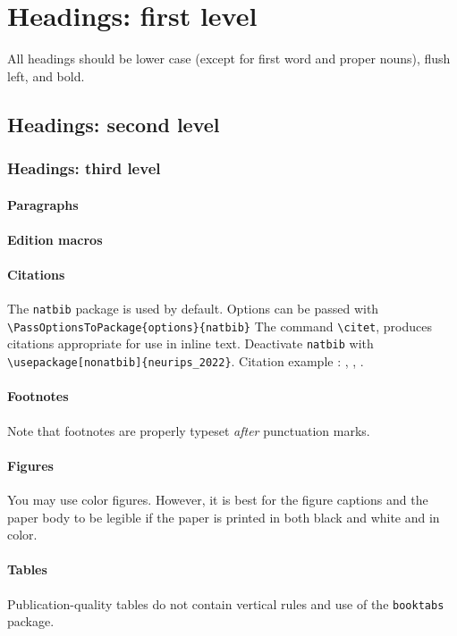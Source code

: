 \section{Headings: first level}
\label{sec:headings}

All headings should be lower case (except for first word and proper nouns),
flush left, and bold.

\subsection{Headings: second level}

\subsubsection{Headings: third level}

\paragraph{Paragraphs}

\paragraph{Edition macros}

\paragraph{Citations}
The \verb+natbib+ package is used by default. 
Options can be passed with \verb+\PassOptionsToPackage{options}{natbib}+
The command \verb+\citet+, produces citations appropriate for
use in inline text.
Deactivate \verb+natbib+ with \verb+\usepackage[nonatbib]{neurips_2022}+.
Citation example : \cite{tropp2010computational}, \citet{tropp2010computational}, \citeyear{tropp2010computational}.

\paragraph{Footnotes}
Note that footnotes are properly typeset \emph{after} punctuation
marks.

\paragraph{Figures}
You may use color figures. 
However, it is best for the figure captions and the paper body to be legible if the paper is printed in both black and white and in color.


\paragraph{Tables}
Publication-quality tables do not contain vertical rules and use of the \verb+booktabs+ package.
